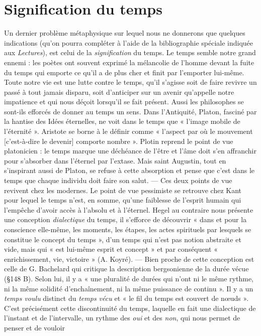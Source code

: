 \section{Signification du temps}%
Un dernier problème métaphysique
sur lequel nous ne donnerons que quelques indications (qu’on
pourra compléter à l'aide de la bibliographie spéciale indiquée aux
{\it Lectures}), est celui de la {\it signification} du temps. Le temps semble
notre grand ennemi : les poètes ont souvent exprimé la mélancolie
de l’homme devant la fuite du temps qui emporte ce qu’il a de plus
cher et finit par l’emporter lui-même. Toute notre vie est une lutte
contre le temps, qu’il s'agisse soit de faire revivre un passé à tout
jamais disparu, soit d’anticiper sur un avenir qu’appelle notre impatience
et qui nous déçoit lorsqu'il se fait présent. Aussi les philosophes
se sont-ils efforcés de donner au temps un sens. Dans l’Antiquité,
Platon, fasciné par la hantise des Idées éternelles, ne voit dans le
temps que « l’image mobile de l'éternité ». Aristote se borne à le
définir comme « l'aspect par où le mouvement [c’est-à-dire le devenir]
comporte nombre ». Plotin reprend le point de vue platonicien : le
temps marque une déchéance de l’être et l’âme doit s’en affranchir
pour s’absorber dans l’éternel par l’extase. Mais saint Augustin, tout
en s'inspirant aussi de Platon, se refuse à cette absorption et pense
que c’est dans le temps que chaque individu doit faire son salut. —
Ces deux points de vue revivent chez les modernes. Le point de vue
pessimiste se retrouve chez Kant pour lequel le temps n’est, en somme,
qu’une faiblesse de l’esprit humain qui l'empêche d’avoir accès à
l'absolu et à l’éternel. Hegel au contraire nous présente une conception
{\it dialectique} du temps, il s’efforce de découvrir « dans et pour la
conscience elle-même, les moments, les étapes, les actes spirituels par
lesquels se constitue le concept du temps », d’un temps qui n’est pas
notion abstraite et vide, mais qui « est lui-même esprit et concept » et
par conséquent « enrichissement, vie, victoire » (A. Koyré). — Bien
proche de cette conception est celle de G. Bachelard qui critique
la description bergsonienne de la durée vécue (\S 148 B). Selon lui,
il y a « une pluralité de durées qui n’ont ni le même rythme, ni la
même solidité d’enchaînement, ni la même puissance de continu ».
Il y a un {\it temps voulu} distinct du {\it temps vécu} et « le fil du temps est
couvert de nœuds ». C’est précisément cette discontinuité du temps,
laquelle en fait une dialectique de l’instant et de l’intervalle, un
rythme des {\it oui} et des {\it non}, qui nous permet de penser et de vouloir
